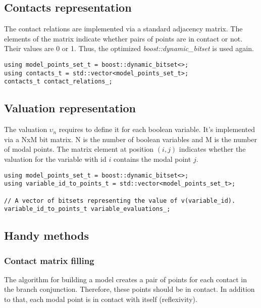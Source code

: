 \documentclass{article}
\begin{document}
	\newpage
	\subsection{Contacts representation}
	The contact relations are implemented via a standard adjacency matrix. The elements of the matrix indicate whether pairs of points are in contact or not. Their values are 0 or 1. Thus, the optimized \textit{boost::dynamic\_bitset} is used again.

\begin{lstlisting}
using model_points_set_t = boost::dynamic_bitset<>;
using contacts_t = std::vector<model_points_set_t>;
contacts_t contact_relations_;
\end{lstlisting}

	\subsection{Valuation representation}
	The valuation $\upsilon_n$ requires to define it for each boolean variable. It's implemented via a NxM bit matrix. N is the number of boolean variables and M is the number of modal points. The matrix element at position $(i, j)$ indicates whether the valuation for the variable with id $i$ contains the modal point $j$.

\begin{lstlisting}
using model_points_set_t = boost::dynamic_bitset<>;
using variable_id_to_points_t = std::vector<model_points_set_t>;

// A vector of bitsets representing the value of v(variable_id).
variable_id_to_points_t variable_evaluations_;
\end{lstlisting}

	\subsection{Handy methods}
	\subsubsection*{Contact matrix filling}
	The algorithm for building a model creates a pair of points for each contact in the branch conjunction. Therefore, these points should be in contact. In addition to that, each modal point is in contact with itself (reflexivity).
\end{document}
